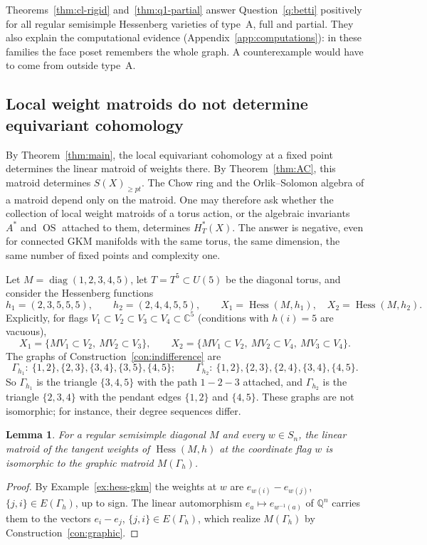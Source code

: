 \documentclass[11pt,a4paper]{article}
\numberwithin{equation}{section}
\theoremstyle{plain}
\newtheorem{lemma}[theorem]{Lemma}
\theoremstyle{definition}
\theoremstyle{remark}
\newcommand{\Q}{\mathbb{Q}}
\newcommand{\C}{\mathbb{C}}
\newcommand{\HT}{H^{*}_{T}}
\DeclareMathOperator{\Hess}{Hess}
\DeclareMathOperator{\diag}{diag}
\DeclareMathOperator{\OS}{OS}
\begin{document}
Theorems~\ref{thm:cl-rigid} and~\ref{thm:q1-partial} answer Question~\ref{q:betti} positively for all regular semisimple Hessenberg varieties of type~A, full and partial. They also explain the computational evidence (Appendix~\ref{app:computations}): in these families the face poset remembers the whole graph. A counterexample would have to come from outside type~A.

\subsection{Local weight matroids do not determine equivariant cohomology}\label{sec:counterexample}

By Theorem~\ref{thm:main}, the local equivariant cohomology at a fixed point determines the linear matroid of weights there. By Theorem~\ref{thm:AC}, this matroid determines $S(X)_{\geqslant pt}$. The Chow ring and the Orlik--Solomon algebra of a matroid depend only on the matroid. One may therefore ask whether the collection of local weight matroids of a torus action, or the algebraic invariants $A^*$ and $\OS$ attached to them, determines $\HT(X)$. The answer is negative, even for connected GKM manifolds with the same torus, the same dimension, the same number of fixed points and complexity one.

Let $M=\diag(1,2,3,4,5)$, let $T=T^5\subset U(5)$ be the diagonal torus, and consider the Hessenberg functions
\[
h_1=(2,3,5,5,5),\qquad h_2=(2,4,4,5,5),\qquad X_1=\Hess(M,h_1),\quad X_2=\Hess(M,h_2).
\]
Explicitly, for flags $V_1\subset V_2\subset V_3\subset V_4\subset\C^5$ (conditions with $h(i)=5$ are vacuous),
\[
X_1=\{MV_1\subset V_2,\ MV_2\subset V_3\},\qquad X_2=\{MV_1\subset V_2,\ MV_2\subset V_4,\ MV_3\subset V_4\}.
\]
The graphs of Construction~\ref{con:indifference} are
\[
\Gamma_{h_1}:\ \{1,2\},\{2,3\},\{3,4\},\{3,5\},\{4,5\};\qquad
\Gamma_{h_2}:\ \{1,2\},\{2,3\},\{2,4\},\{3,4\},\{4,5\}.
\]
So $\Gamma_{h_1}$ is the triangle $\{3,4,5\}$ with the path $1-2-3$ attached, and $\Gamma_{h_2}$ is the triangle $\{2,3,4\}$ with the pendant edges $\{1,2\}$ and $\{4,5\}$. These graphs are not isomorphic; for instance, their degree sequences differ.

\begin{lemma}\label{lem:local-hess}
For a regular semisimple diagonal $M$ and every $w\in S_n$, the linear matroid of the tangent weights of $\Hess(M,h)$ at the coordinate flag $w$ is isomorphic to the graphic matroid $M(\Gamma_h)$.
\end{lemma}
\begin{proof}
By Example~\ref{ex:hess-gkm} the weights at $w$ are $e_{w(i)}-e_{w(j)}$, $\{j,i\}\in E(\Gamma_h)$, up to sign. The linear automorphism $e_a\mapsto e_{w^{-1}(a)}$ of $\Q^n$ carries them to the vectors $e_i-e_j$, $\{j,i\}\in E(\Gamma_h)$, which realize $M(\Gamma_h)$ by Construction~\ref{con:graphic}.
\end{proof}
\end{document}
